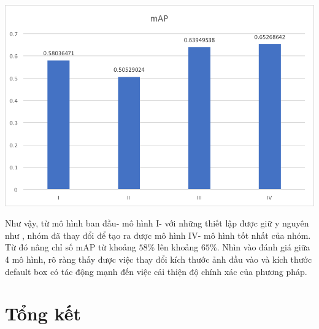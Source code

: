 \documentclass[a4paper,12pt]{article}
\begin{document}
	\vspace{1.5cm}
	\begin{center}
		\centering
		\includegraphics[width=0.775\linewidth]{mAP.png}
		\vspace{0.5cm}
	\end{center}
	Như vậy, từ mô hình ban đầu- mô hình I- với những thiết lập được giữ y nguyên như \cite{liu2016ssd}, nhóm đã thay đổi để tạo ra được mô hình IV- mô hình tốt nhất của nhóm. Từ đó nâng chỉ số mAP từ khoảng $58\%$ lên khoảng $65\%$. Nhìn vào đánh giá giữa 4 mô hình, rõ ràng thấy được việc thay đổi kích thước ảnh đầu vào và kích thước default box có tác động mạnh đến việc cải thiện độ chính xác của phương pháp. 
	\newpage	
	\section{Tổng kết}
	
\end{document}
